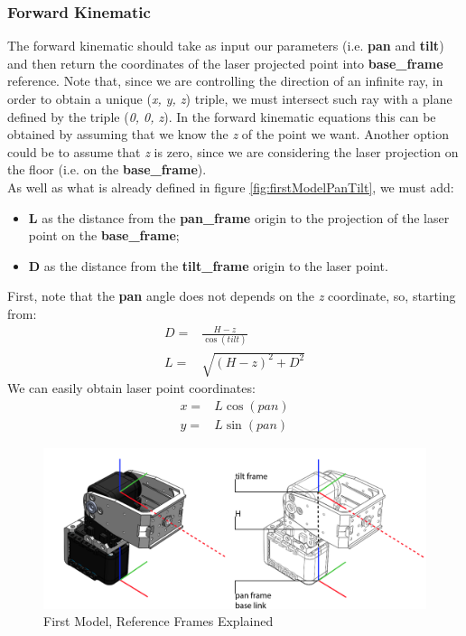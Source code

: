 \subsubsection{Forward Kinematic}
The forward kinematic should take as input our parameters (i.e. \textbf{pan} and \textbf{tilt}) and then return the coordinates of the laser projected point into \textbf{base\_frame} reference. 
Note that, since we are controlling the direction of an infinite ray, in order to obtain a unique (\textit{x, y, z}) triple, we must intersect such ray with a plane defined by the triple (\textit{0, 0, z}). In the forward kinematic equations this can be obtained by assuming that we know the \textit{z} of the point we want. Another option could be to assume that \textit{z} is zero, since we are considering the laser projection on the floor (i.e. on the \textbf{base\_frame}). \\
As well as what is already defined in figure \ref{fig:firstModelPanTilt}, we must add:
\begin{itemize}
    \item \textbf{L} as the distance from the \textbf{pan\_frame} origin to the projection of the laser point on the \textbf{base\_frame};
    \item \textbf{D} as the distance from the \textbf{tilt\_frame} origin to the laser point.
\end{itemize}
First, note that the \textbf{pan} angle does not depends on the \textit{z} coordinate, so, starting from:
\begin{align}
	D=& \frac{H-z}{\cos{(tilt)}} \label{eq:d}\\
	L=& \sqrt{(H-z)^2 + D^2}
\end{align}
We can easily obtain laser point coordinates:
\begin{align}
	x=& L\cos{(pan)}\label{eq:x}\\
	y=& L\sin{(pan)} \label{eq:y}
\end{align}

\begin{figure}
	\centering
	\includegraphics[width=\textwidth]{img/model1Ref.png}%
	\caption{First Model, Reference Frames Explained}
	\label{fig:model1FrameCap}
\end{figure}

